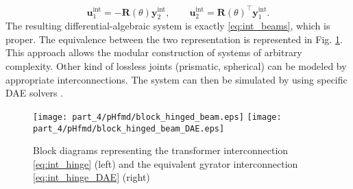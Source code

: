 \begin{equation}
\label{eq:int_hinge_DAE}
\mathbf{u}_1^{\text{int}} = -\mathbf{R}(\theta) \mathbf{y}_2^{\text{int}}, \qquad
\mathbf{u}_2^{\text{int}} = \mathbf{R}(\theta)^\top \mathbf{y}_1^{\text{int}}.
\end{equation}
The resulting differential-algebraic system is exactly \eqref{eq:int_beams}, which is proper. The equivalence between the two representation is represented in Fig. \ref{fig:beam_int_block}. This approach allows the modular construction of systems of arbitrary complexity. Other kind of lossless joints (prismatic, spherical) can be modeled by appropriate interconnections. The system can then be simulated by using specific DAE solvers \cite{brenan1995dae}. 

\begin{figure}[t]
	\centering
	\texttt{[image: part\_4/pHfmd/block\_hinged\_beam.eps]} \hspace{.5cm}
	\texttt{[image: part\_4/pHfmd/block\_hinged\_beam\_DAE.eps]} 	
	\caption{Block diagrams representing the transformer interconnection \eqref{eq:int_hinge} (left) and the equivalent gyrator interconnection \eqref{eq:int_hinge_DAE} (right)}
	\label{fig:beam_int_block}
\end{figure}

